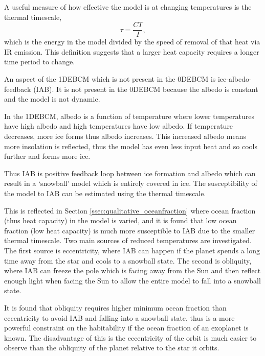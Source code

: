 \documentclass[12pt, onecolumn]{revtex4-2}    %
\begin{document}
A useful measure of how effective the model is at changing temperatures is the thermal timescale,
\begin{equation}
  \tau = \frac{C T}{I},
\end{equation}
which is the energy in the model divided by the speed of removal of that heat via IR emission.
This definition suggests that a larger heat capacity requires a longer time period to change.

%
An aspect of the 1DEBCM which is not present in the 0DEBCM is ice-albedo-feedback (IAB).
It is not present in the 0DEBCM because the albedo is constant and the model is not dynamic.

In the 1DEBCM, albedo is a function of temperature where lower temperatures have high albedo and high temperatures have low albedo.
If temperature decreases, more ice forms thus albedo increases.
This increased albedo means more insolation is reflected, thus the model has even less input heat and so cools further and forms more ice.

Thus IAB is positive feedback loop between ice formation and albedo which can result in a `snowball' model which is entirely covered in ice.
The susceptibility of the model to IAB can be estimated using the thermal timescale.

This is reflected in Section \ref{ssec:qualitative_oceanfraction} where ocean fraction (thus heat capacity) in the model is varied, and it is found that low ocean fraction (low heat capacity) is much more susceptible to IAB due to the smaller thermal timescale.
Two main sources of reduced temperatures are investigated.
The first source is eccentricity, where IAB can happen if the planet spends a long time away from the star and cools to a snowball state.
The second is obliquity, where IAB can freeze the pole which is facing away from the Sun and then reflect enough light when facing the Sun to allow the entire model to fall into a snowball state.

It is found that obliquity requires higher minimum ocean fraction than eccentricity to avoid IAB and falling into a snowball state, thus is a more powerful constraint on the habitability if the ocean fraction of an exoplanet is known. The disadvantage of this is the eccentricity of the orbit is much easier to observe than the obliquity of the planet relative to the star it orbits.

%
\end{document}

